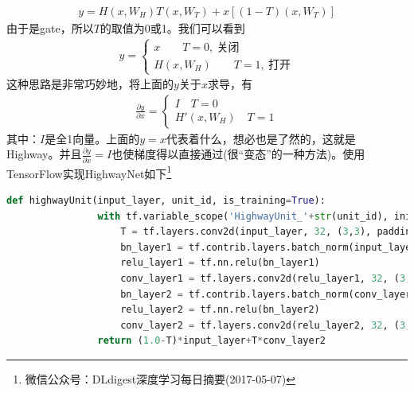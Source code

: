             \begin{align*}
            y = H(x,W_H)T(x,W_T)+x[(1-T)(x,W_T)]
            \end{align*}
            由于是gate，所以$T$的取值为0或1。我们可以看到
            \begin{align*}
            y =
            \left\{
            \begin{aligned}
            x \qquad T = 0, \ \text{关闭}\\
            H(x,W_H)\qquad T = 1,\ \text{打开}
            \end{aligned}
            \right.
            \end{align*}
            这种思路是非常巧妙地，将上面的$y$关于$x$求导，有
            \begin{align*}
            \frac{\partial y}{\partial x} =
            \left\{
            \begin{aligned}
            I \quad T=0\\
            H'(x,W_H) \quad T=1
            \end{aligned}
            \right.
            \end{align*}
            其中：$I$是全1向量。上面的$y = x$代表着什么，想必也是了然的，这就是Highway。并且$\frac{\partial y}{\partial x} = I$也使梯度得以直接通过(很“变态”的一种方法)。使用TensorFlow实现HighwayNet如下\footnote{微信公众号：DLdigest深度学习每日摘要(2017-05-07)}
            \begin{lstlisting}[language = Python]
            def highwayUnit(input_layer, unit_id, is_training=True):
                with tf.variable_scope('HighwayUnit_'+str(unit_id), initializer=tf.random_normal_initializer()):
                    T = tf.layers.conv2d(input_layer, 32, (3,3), padding='same')
                    bn_layer1 = tf.contrib.layers.batch_norm(input_layer, is_training=is_training)
                    relu_layer1 = tf.nn.relu(bn_layer1)
                    conv_layer1 = tf.layers.conv2d(relu_layer1, 32, (3,3), padding='same')
                    bn_layer2 = tf.contrib.layers.batch_norm(conv_layer1, is_training=is_training)
                    relu_layer2 = tf.nn.relu(bn_layer2)
                    conv_layer2 = tf.layers.conv2d(relu_layer2, 32, (3,3), padding='same')
                return (1.0-T)*input_layer+T*conv_layer2
            \end{lstlisting}

